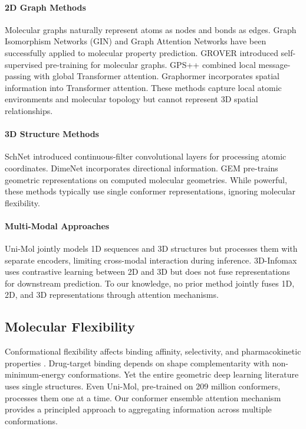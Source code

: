 \documentclass[11pt]{article}
\begin{document}
\paragraph{2D Graph Methods}
Molecular graphs naturally represent atoms as nodes and bonds as edges. Graph Isomorphism Networks (GIN) \citep{xu2019powerful} and Graph Attention Networks \citep{velickovic2018graph} have been successfully applied to molecular property prediction. GROVER \citep{rong2020grover} introduced self-supervised pre-training for molecular graphs. GPS++ \citep{masters2023gps} combined local message-passing with global Transformer attention. Graphormer \citep{ying2021transformers} incorporates spatial information into Transformer attention. These methods capture local atomic environments and molecular topology but cannot represent 3D spatial relationships.

\paragraph{3D Structure Methods}
SchNet \citep{schutt2017schnet} introduced continuous-filter convolutional layers for processing atomic coordinates. DimeNet \citep{gasteiger2020directional} incorporates directional information. GEM \citep{fang2022geometry} pre-trains geometric representations on computed molecular geometries. While powerful, these methods typically use single conformer representations, ignoring molecular flexibility.

\paragraph{Multi-Modal Approaches}
Uni-Mol \citep{zhou2023unimol} jointly models 1D sequences and 3D structures but processes them with separate encoders, limiting cross-modal interaction during inference. 3D-Infomax \citep{stark20223d} uses contrastive learning between 2D and 3D but does not fuse representations for downstream prediction. To our knowledge, no prior method jointly fuses 1D, 2D, and 3D representations through attention mechanisms.

\subsection{Molecular Flexibility}

Conformational flexibility affects binding affinity, selectivity, and pharmacokinetic properties \citep{hawkins2017conformation}. Drug-target binding depends on shape complementarity with non-minimum-energy conformations. Yet the entire geometric deep learning literature uses single structures. Even Uni-Mol, pre-trained on 209 million conformers, processes them one at a time. Our conformer ensemble attention mechanism provides a principled approach to aggregating information across multiple conformations.
\end{document}
